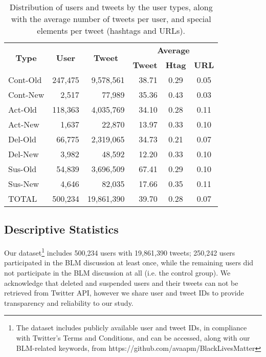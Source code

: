 \documentclass[sigconf]{acmart}
\begin{document}
\begin{table}[t]
\fontsize{9}{10.8}\selectfont
\caption{Distribution of users and tweets by the user types, along with the average number of tweets per user, and special elements per tweet (hashtags and URLs).}
\label{tab:user_tweet_counts}
\centering
\begin{tabular}{|l|r|r|r|c|c|}

\hline
\multicolumn{1}{|c|}{\multirow{2}{*}{\textbf{Type}}} & \multicolumn{1}{|c|}{\multirow{2}{*}{\textbf{User}}} & \multicolumn{1}{|c|}{\multirow{2}{*}{\textbf{Tweet}}} & \multicolumn{3}{c|}{\textbf{Average}} \\\cline{4-6}
& & & \textbf{Tweet} & \textbf{Htag} & \textbf{URL} \\
\hline
Cont-Old & 247,475 & 9,578,561 & 38.71 & 0.29 & 0.05 \\ \hline

Cont-New & 2,517 & 77,989 & 35.36 & 0.43 & 0.03 \\ \hline

Act-Old & 118,363 & 4,035,769 & 34.10 & 0.28 & 0.11 \\ \hline

Act-New & 1,637 & 22,870 & 13.97 & 0.33 & 0.10 \\ \hline

Del-Old & 66,775 & 2,319,065 & 34.73 & 0.21 & 0.07 \\ \hline

Del-New & 3,982 & 48,592 & 12.20 & 0.33 & 0.10 \\ \hline

Sus-Old & 54,839 & 3,696,509 & 67.41 & 0.29 & 0.10 \\ \hline

Sus-New & 4,646 & 82,035 & 17.66 & 0.35 & 0.11 \\ \hline

TOTAL & 500,234 & 19,861,390 & 39.70 & 0.28 & 0.07 \\ \hline
\end{tabular}
\end{table}

\subsection{Descriptive Statistics}
Our dataset\footnote{The dataset includes publicly available user and tweet IDs, in compliance with Twitter's Terms and Conditions, and can be accessed, along with our BLM-related keywords, from https://github.com/avaapm/BlackLivesMatter} includes 500,234 users with 19,861,390 tweets; 250,242 users participated in the BLM discussion at least once, while the remaining users did not participate in the BLM discussion at all (i.e. the control group). We acknowledge that deleted and suspended users and their tweets can not be retrieved from Twitter API, however we share user and tweet IDs to provide transparency and reliability to our study.
\end{document}
